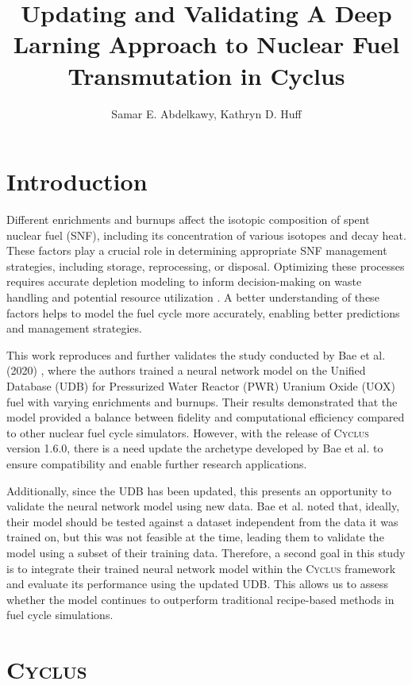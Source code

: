 \documentclass{anstrans}
\title{Updating and Validating A Deep Larning Approach to Nuclear Fuel Transmutation in Cyclus}
\author{Samar E. Abdelkawy, Kathryn D. Huff}
\institute{
Advanced Reactors and Fuel Cycles Group, University of Illinois,
Urbana, IL, selsafy2@illinois.edu}
\newcommand{\cyclus}{\textsc{Cyclus}\xspace}
\begin{document}
\section{Introduction}
Different enrichments and burnups affect the isotopic composition of spent nuclear fuel (SNF), including its concentration of various isotopes and decay heat. These factors play a crucial role in determining appropriate SNF management strategies, including storage, reprocessing, or disposal. Optimizing these processes requires accurate depletion modeling to inform decision-making on waste handling and potential resource utilization \cite{yacout_modeling_2005}. A better understanding of these factors helps to model the fuel cycle more accurately, enabling better predictions and management strategies.

This work reproduces and further validates the study conducted by Bae et al. (2020) \cite{bae_deep_2020}, where the authors trained a neural network model on the Unified Database (UDB) for Pressurized Water Reactor (PWR) Uranium Oxide (UOX) fuel with varying enrichments and burnups. Their results demonstrated that the model provided a balance between fidelity and computational efficiency compared to other nuclear fuel cycle simulators. However, with the release of \cyclus version 1.6.0, there is a need update the archetype developed by Bae et al. to ensure compatibility and enable further research applications.


Additionally, since the UDB has been updated, this presents an opportunity to validate the neural network model using new data. Bae et al. noted that, ideally, their model should be tested against a dataset independent from the data it was trained on, but this was not feasible at the time, leading them to validate the model using a subset of their training data. Therefore, a second goal in this study is to integrate their trained neural network model within the \cyclus framework and evaluate its performance using the updated UDB. This allows us to assess whether the model continues to outperform traditional recipe-based methods in fuel cycle simulations.




\section{\cyclus}
\end{document}
